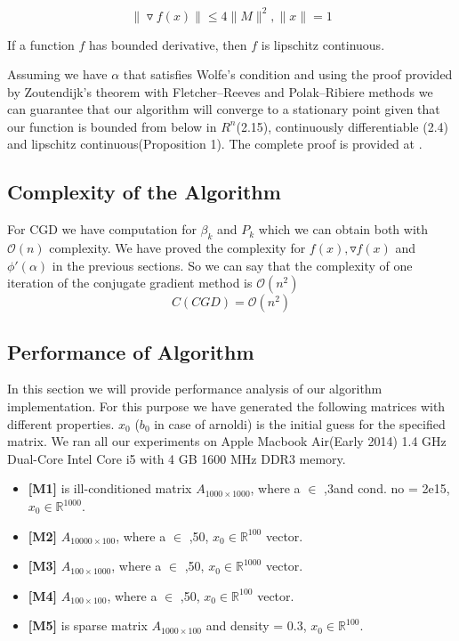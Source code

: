 \documentclass{article}
\numberwithin{equation}{section}
\begin{document}
\begin{equation}
 \|\triangledown f(x)\| \leq 4\|M\|^2 , \|x\|=1 
\end{equation}

\begin{proposition}
If a function $f$ has bounded derivative, then $f$ is lipschitz continuous.
\end{proposition}

Assuming we have $\alpha$ that satisfies Wolfe's condition and using the proof provided by Zoutendijk’s theorem with Fletcher–Reeves and Polak–Ribiere methods we can guarantee that our algorithm will converge to a stationary point given that our function is bounded from below in $R^n$(2.15), continuously differentiable (2.4) and lipschitz continuous(Proposition 1). The complete proof is provided at  \cite[pg.~127-131]{1}.


\subsection{Complexity of the Algorithm}
For CGD we have computation for $\beta _k$ and $P_k$ which we can obtain both with $\mathcal{O}(n)$ complexity. We have proved the complexity for $f(x), \triangledown f(x)$ and $ \phi ' (\alpha)$ in the previous sections. So we can say that the complexity of one iteration of the conjugate gradient method is $\mathcal{O}(n^2)$
 \begin{equation}
 C(CGD) = \mathcal{O}(n^2)
\end{equation}


\subsection{Performance of Algorithm}
In this section we will provide performance analysis of our algorithm implementation. For this purpose we have generated the following matrices with different properties. $x_0$ ($b_0$ in case of arnoldi) is the initial guess for the specified matrix. We ran all our experiments on Apple Macbook Air(Early 2014) 1.4 GHz Dual-Core Intel Core i5 with 4 GB 1600 MHz DDR3 memory.

\begin{itemize}
    \item \textbf{[M1]} is ill-conditioned matrix  $A_{1000\times1000}$, where a $\in$ ,3\rbrack and cond. no = 2e15, $x_0 \in \mathbb{R}^{1000}$.
    \item \textbf{[M2]} $A_{10000\times100}$, where a $\in$ ,50\rbrack ,  $x_0 \in \mathbb{R}^{100}$ vector.
    \item \textbf{[M3]} $A_{100\times1000}$, where a $\in$ ,50\rbrack ,  $x_0 \in \mathbb{R}^{1000}$ vector.
    \item \textbf{[M4]} $A_{100\times100}$, where a $\in$ ,50\rbrack , $x_0 \in \mathbb{R}^{100}$ vector.
    \item \textbf{[M5]} is sparse matrix  $A_{1000\times100}$ and density = 0.3, $x_0 \in \mathbb{R}^{100}$.
\end{itemize}
\end{document}
